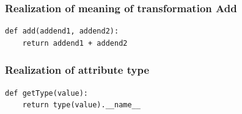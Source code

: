 \subsubsection*{Realization of meaning of transformation Add}
\begin{verbatim}
def add(addend1, addend2):
    return addend1 + addend2
\end{verbatim}

\subsubsection*{Realization of attribute type}
\begin{verbatim}
def getType(value):
    return type(value).__name__
\end{verbatim}

